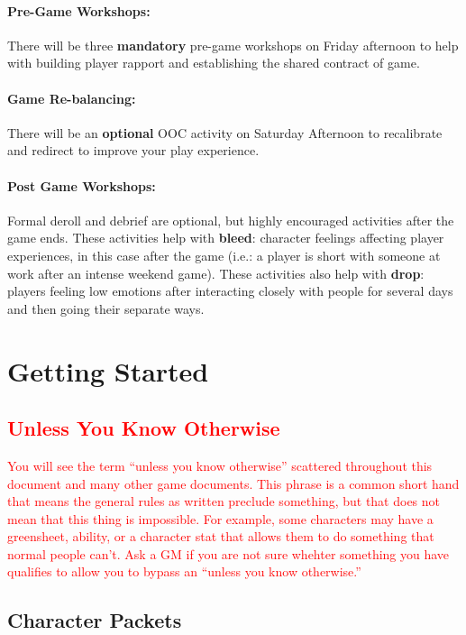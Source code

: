\documentclass[sheet]{GL2020}
\begin{document}
\paragraph{Pre-Game Workshops:} There will be three \textbf{mandatory} pre-game workshops on Friday afternoon to help with building player rapport and establishing the shared contract of game.

\paragraph{Game Re-balancing:} There will be an \textbf{optional} OOC activity on Saturday Afternoon to recalibrate and redirect to improve your play experience.

\paragraph{Post Game Workshops:} Formal deroll and debrief are optional, but highly encouraged activities after the game ends. These activities help with \textbf{bleed}: character feelings affecting player experiences, in this case after the game (i.e.: a player is short with someone at work after an intense weekend game). These activities also help with \textbf{drop}: players feeling low emotions after interacting closely with people for several days and then going their separate ways.

\section{Getting Started}
\textcolor{red}{\subsection{Unless You Know Otherwise}
You will see the term ``unless you know otherwise'' scattered throughout this document and many other game documents. This phrase is a common short hand that means the general rules as written preclude something, but that does not mean that this thing is impossible. For example, some characters may have a greensheet, ability, or a character stat that allows them to do something that normal people can't. Ask a GM if you are not sure whehter something you have qualifies to allow you to bypass an ``unless you know otherwise.''}

\subsection{Character Packets}
\end{document}
